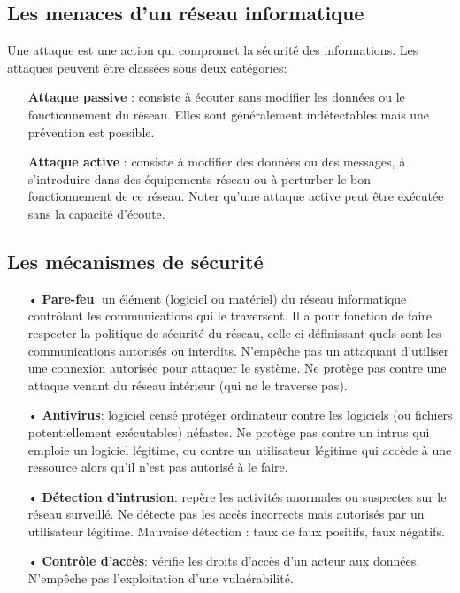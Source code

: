 \newpage

\subsection{Les menaces d’un réseau informatique}
Une attaque est une action qui compromet la sécurité des informations. Les attaques peuvent être classées sous deux catégories:\\
\begin{itemize}
\item[\textbf{Attaque passive}]: consiste à écouter sans modifier les données ou le fonctionnement du réseau. Elles sont généralement indétectables mais une prévention est possible.\\
\item[\textbf{Attaque active}]: consiste à modifier des données ou des messages, à s'introduire dans des équipements réseau ou à perturber le bon fonctionnement de ce réseau. Noter qu'une attaque active peut être exécutée sans la capacité d'écoute.
\end{itemize}

\subsection{Les mécanismes de sécurité}
\begin{itemize}
\item[•]\textbf{Pare-feu}: un élément (logiciel ou matériel) du réseau informatique contrôlant les communications qui le traversent. Il a pour fonction de faire respecter la politique de sécurité du réseau, celle-ci définissant quels sont les communications autorisés ou interdits. N'empêche pas un attaquant d'utiliser une connexion autorisée pour attaquer le système. Ne protège pas contre une attaque venant du réseau intérieur (qui ne le traverse pas).\\
\item[•]\textbf{Antivirus}: logiciel censé protéger ordinateur contre les logiciels (ou fichiers potentiellement exécutables) néfastes. Ne protège pas contre un intrus qui emploie un logiciel légitime, ou contre un utilisateur légitime qui accède à une ressource alors qu'il n'est pas autorisé à le faire.\\
\item[•]\textbf{Détection d'intrusion}: repère les activités anormales ou suspectes sur le réseau surveillé. Ne détecte pas les accès incorrects mais autorisés par un utilisateur légitime. Mauvaise détection : taux de faux positifs, faux négatifs.\\
\item[•]\textbf{Contrôle d’accès}: vérifie les droits d’accès d'un acteur aux données. N'empêche pas l'exploitation d'une vulnérabilité.
\end{itemize}

